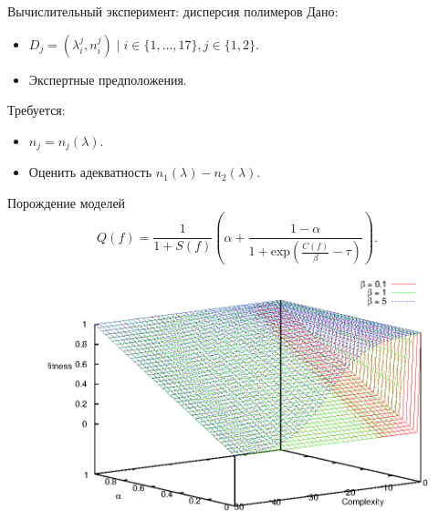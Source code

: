 \documentclass{beamer}
\begin{document}
\begin{frame}{Вычислительный эксперимент: дисперсия полимеров}
  Дано:
  \begin{itemize}
    \item $D_j = (\lambda_i^j, n_i^j) \mid i \in \{ 1, \dots, 17 \}, j \in \{ 1, 2 \}.$
    \item Экспертные предположения.
  \end{itemize}
  
  Требуется:
  \begin{itemize}
    \item $n_j = n_j(\lambda).$
    \item Оценить адекватность $n_1 (\lambda) - n_2 (\lambda)$.
  \end{itemize}
\end{frame}

\begin{frame}{Порождение моделей}
  \[
    Q(f) = \frac{1}{1 + S(f)} \left(\alpha + \frac{1 - \alpha}{1 + \text{exp} (\frac{C(f)}{\beta} - \tau)}\right).
  \]

  \begin{figure}[h]
    \vspace{-20pt}
    \includegraphics[scale=0.8]{figs/fitness.eps}
    \vspace{-30pt}
  \end{figure}
\end{frame}
\end{document}
